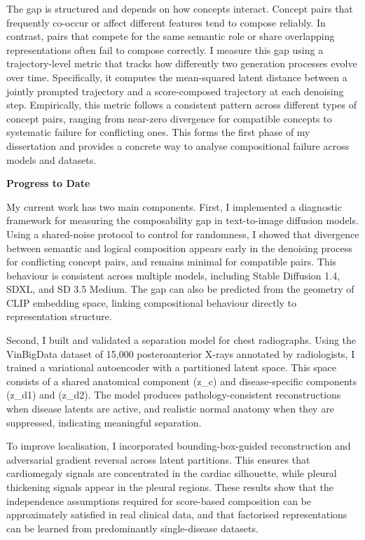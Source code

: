 \documentclass[12pt,a4paper]{article}
\begin{document}
The gap is structured and depends on how concepts interact. Concept pairs that frequently co-occur or affect different features tend to compose reliably. In contrast, pairs that compete for the same semantic role or share overlapping representations often fail to compose correctly. I measure this gap using a trajectory-level metric that tracks how differently two generation processes evolve over time. Specifically, it computes the mean-squared latent distance between a jointly prompted trajectory and a score-composed trajectory at each denoising step. Empirically, this metric follows a consistent pattern across different types of concept pairs, ranging from near-zero divergence for compatible concepts to systematic failure for conflicting ones. This forms the first phase of my dissertation and provides a concrete way to analyse compositional failure across models and datasets.

\textbf{Progress to Date}

My current work has two main components. First, I implemented a diagnostic framework for measuring the composability gap in text-to-image diffusion models. Using a shared-noise protocol to control for randomness, I showed that divergence between semantic and logical composition appears early in the denoising process for conflicting concept pairs, and remains minimal for compatible pairs. This behaviour is consistent across multiple models, including Stable Diffusion 1.4, SDXL, and SD 3.5 Medium. The gap can also be predicted from the geometry of CLIP embedding space, linking compositional behaviour directly to representation structure.

Second, I built and validated a separation model for chest radiographs. Using the VinBigData dataset of 15,000 posteroanterior X-rays annotated by radiologists, I trained a variational autoencoder with a partitioned latent space. This space consists of a shared anatomical component (z_c) and disease-specific components (z_{d1}) and (z_{d2}). The model produces pathology-consistent reconstructions when disease latents are active, and realistic normal anatomy when they are suppressed, indicating meaningful separation.

To improve localisation, I incorporated bounding-box-guided reconstruction and adversarial gradient reversal across latent partitions. This ensures that cardiomegaly signals are concentrated in the cardiac silhouette, while pleural thickening signals appear in the pleural regions. These results show that the independence assumptions required for score-based composition can be approximately satisfied in real clinical data, and that factorised representations can be learned from predominantly single-disease datasets.
\end{document}
